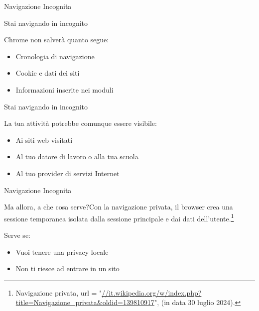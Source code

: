 \begin{frame}{Navigazione Incognita}
	\begin{alertblock}{Stai navigando in incognito}{
			Chrome non salverà quanto segue:
			\begin{itemize}
				\item Cronologia di navigazione
				\item Cookie e dati dei siti
				\item Informazioni inserite nei moduli
			\end{itemize}}
	\end{alertblock}
		\begin{alertblock}{Stai navigando in incognito}{
			La tua attività potrebbe comunque essere visibile:
			\begin{itemize}
				\item Ai siti web visitati
				\item Al tuo datore di lavoro o alla tua scuola
				\item Al tuo provider di servizi Internet
			\end{itemize}}
	\end{alertblock}
\end{frame}
\begin{frame}{Navigazione Incognita}
	\begin{alertblock}{Ma allora, a che cosa serve?}{Con la navigazione privata, il browser crea una sessione temporanea isolata dalla sessione principale e dai dati dell'utente.\footnote{Navigazione privata, url = "\url{//it.wikipedia.org/w/index.php?title=Navigazione_privata&oldid=139810917}", (in data 30 luglio 2024).}}
	\end{alertblock}
	\begin{alertblock}{Serve se:}{
			\begin{itemize}
				\item Vuoi tenere una privacy locale
				\item Non ti riesce ad entrare in un sito
		\end{itemize}}
	\end{alertblock}
\end{frame}
